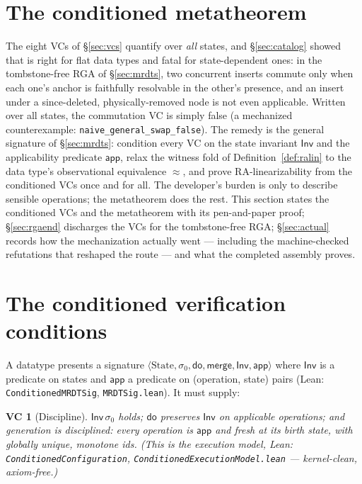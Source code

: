 \documentclass[11pt]{article}
\newtheorem{vc}{VC}
\newcommand{\lean}[1]{\texttt{#1}}
\newcommand{\st}{\sigma}
\newcommand{\ini}{\st_0}
\newcommand{\dodo}{\mathsf{do}}
\newcommand{\merge}{\mathsf{merge}}
\newcommand{\eqobs}{\approx}
\newcommand{\Inv}{\mathsf{Inv}}
\newcommand{\app}{\mathsf{app}}
\begin{document}
\section{The conditioned metatheorem}
\label{sec:condmeta}

The eight VCs of \S\ref{sec:vcs} quantify over \emph{all} states, and
\S\ref{sec:catalog} showed that is right for flat data types and fatal
for state-dependent ones: in the tombstone-free RGA of
\S\ref{sec:mrdts}, two concurrent inserts commute only when each one's
anchor is faithfully resolvable in the other's presence, and an insert
under a since-deleted, physically-removed node is not even applicable.
Written over all states, the commutation VC is simply false (a mechanized
counterexample: \lean{naive\_general\_swap\_false}). The remedy is the
general signature of \S\ref{sec:mrdts}: condition every VC on the state
invariant $\Inv$ and the applicability predicate $\app$, relax the
witness fold of Definition~\ref{def:ralin} to the data type's
observational equivalence $\eqobs$, and prove RA-linearizability from the
conditioned VCs once and for all. The developer's burden is only to
describe sensible operations; the metatheorem does the rest. This section
states the conditioned VCs and the metatheorem with its pen-and-paper
proof; \S\ref{sec:rgaend} discharges the VCs for the tombstone-free RGA;
\S\ref{sec:actual} records how the mechanization actually went ---
including the machine-checked refutations that reshaped the route --- and
what the completed assembly proves.

\section{The conditioned verification conditions}\label{sec:cvcs}

A datatype presents a signature
$\langle \text{State}, \ini, \dodo, \merge, \Inv, \app \rangle$ where $\Inv$ is a predicate
on states and $\app$ a predicate on (operation, state) pairs (Lean:
\lean{ConditionedMRDTSig}, \lean{MRDTSig.lean}). It must supply:

\begin{vc}[Discipline]\label{vc:disc}
$\Inv\,\ini$ holds; $\dodo$ preserves $\Inv$ on applicable operations; and generation is
disciplined: every operation is $\app$ and \emph{fresh} at its birth state, with globally
unique, monotone ids. (This is the execution model, Lean:
\lean{ConditionedConfiguration}, \lean{ConditionedExecutionModel.lean} --- kernel-clean,
axiom-free.)
\end{vc}
\end{document}
